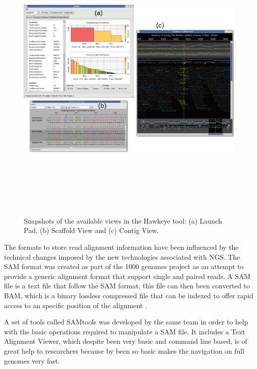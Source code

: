 \begin{figure}  
\includegraphics[height=5.7in,angle=90]{figures/hawkeye.png}
\caption[Hawkeye Interface Views.]{Snapshots of the available views in the Hawkeye tool: (a) Launch Pad, (b) Scaffold View and (c) Contig View.
\label{fig:hawkeye}}
\end{figure}

The formats to store read alignment information have been influenced by the technical changes imposed by the new technologies associated with NGS. The SAM format was created as part of the 1000 genomes project as an attempt to provide a generic alignment format that support single and paired reads. A SAM file is a text file that follow the SAM format, this file can then been converted to BAM, which is a binary lossless compressed file that can be indexed to offer rapid access to an specific position of the alignment \cite{HEN2009}. 

A set of tools called SAMtools was developed by the same team in order to help with the basic operations required to manipulate a SAM file. It includes a Text Alignment Viewer, which despite been very basic and command line based, is of great help to researchers because by been so basic makes the navigation on full genomes very fast.

